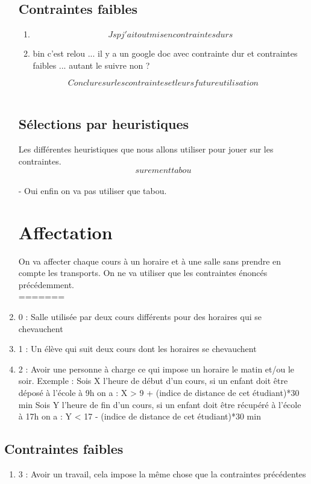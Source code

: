 \documentclass[a4paper,11pt]{article}
\begin{document}
\begin{enumerate}
	\subsection{Contraintes faibles}
		\begin{enumerate}
			\item $$Jsp j'ai tout mis en contraintes durs$$
			\item bin c'est relou ... il y a un google doc avec contrainte dur et contraintes faibles ... autant le suivre non ?
		\end{enumerate}
	$$Conclure sur les contraintes et leurs future utilisation$$\\
	\subsection{Sélections par heuristiques}
		Les différentes heuristiques que nous allons utiliser pour jouer sur les 
		contraintes. $$surement tabou$$ \\
		- Oui enfin on va pas utiliser que tabou. \\

\section{Affectation}
	On va affecter chaque cours à un horaire et à une salle sans prendre en compte les transports. On ne va utiliser que les contraintes énoncés précédemment. \\
=======
			\item 0 : Salle utilisée par deux cours différents pour des horaires 
			qui se chevauchent
			\item 1 : Un élève qui suit deux cours dont les horaires se chevauchent
			\item 2 : Avoir une personne à charge ce qui impose un horaire le matin et/ou le soir.
			Exemple : Sois X l'heure de début d'un cours, si un enfant doit être déposé à l'école à 9h on a : X > 9 + (indice de distance de cet étudiant)*30 min
			Sois Y l'heure de fin d'un cours, si un enfant doit être récupéré à l'école à 17h on a : Y < 17 - (indice de distance de cet étudiant)*30 min			
		\end{enumerate}
	\subsection{Contraintes faibles}
		\begin{enumerate}
			\item 3 : Avoir un travail, cela impose la même chose que la contraintes précédentes
		\end{enumerate}
\end{document}

